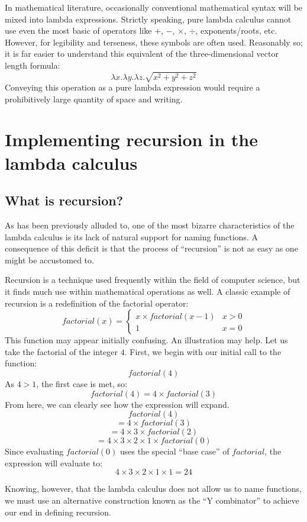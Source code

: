 \documentclass[twocolumn,titlepage,12pt]{article}
\begin{document}
In mathematical literature, occasionally conventional mathematical syntax will be mixed into lambda expressions. Strictly speaking, pure lambda calculus cannot use even the most basic of operators like $+$, $-$, $\times$, $\div$, exponents/roots, etc. However, for legibility and terseness, these symbols are often used. Reasonably so; it is far easier to understand this equivalent of the three-dimensional vector length formula:
$$\lambda x.\lambda y.\lambda z.\sqrt{x^2+y^2+z^2}$$
Conveying this operation as a pure lambda expression would require a prohibitively large quantity of space and writing.

\section{Implementing recursion in the lambda calculus}
\subsection{What is recursion?}
As has been previously alluded to, one of the most bizarre characteristics of the lambda calculus is its lack of natural support for naming functions. A consequence of this deficit is that the process of ``recursion'' is not as easy as one might be accustomed to.

Recursion is a technique used frequently within the field of computer science, but it finds much use within mathematical operations as well. A classic example of recursion is a redefinition of the factorial operator:
\[
factorial(x)=
\begin{cases}
    x\times factorial(x-1) & x>0 \\
    1 & x=0
\end{cases}
\]
This function may appear initially confusing. An illustration may help. Let us take the factorial of the integer $4$. First, we begin with our initial call to the function:
$$factorial(4)$$
As $4>1$, the first case is met, so:
$$factorial(4)=4\times factorial(3)$$
From here, we can clearly see how the expression will expand.
$$factorial(4)$$
$$=4\times factorial(3)$$
$$=4\times 3\times factorial(2)$$
$$=4\times 3\times 2\times 1\times factorial(0)$$
Since evaluating $factorial(0)$ uses the special ``base case'' of $factorial$, the expression will evaluate to:
$$4\times 3\times 2\times 1\times 1=24$$

Knowing, however, that the lambda calculus does not allow us to name functions, we must use an alternative construction known as the ``Y combinator'' to achieve our end in defining recursion.
\end{document}

